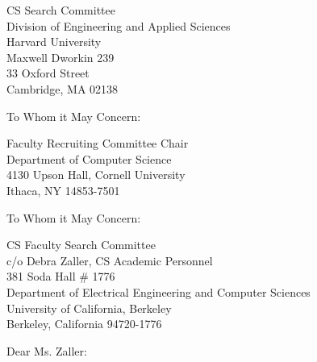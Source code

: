 \begin{letter}
{CS Search Committee\\
Division of Engineering and Applied Sciences\\
Harvard University\\
Maxwell Dworkin 239\\
33 Oxford Street\\
Cambridge, MA 02138}
\opening{To Whom it May Concern:}
\text
\end{letter}

\begin{letter}
{Faculty Recruiting Committee Chair\\
Department of Computer Science\\
4130 Upson Hall, Cornell University\\
Ithaca, NY 14853-7501}
\opening{To Whom it May Concern:}
\text
\end{letter}

\begin{letter}
{CS Faculty Search Committee\\
c/o Debra Zaller, CS Academic Personnel\\
381 Soda Hall \# 1776\\
Department of Electrical Engineering and Computer Sciences\\
University of California, Berkeley\\
Berkeley, California 94720-1776}
\opening{Dear Ms. Zaller:}
\text
\end{letter}

